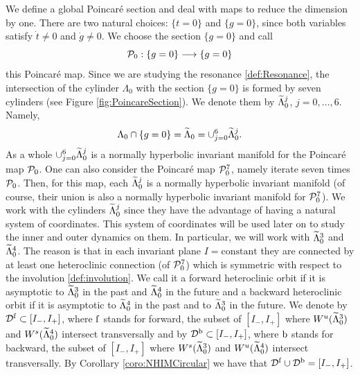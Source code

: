 We define a global Poincar{\'e} section and deal with maps to reduce the
dimension by one.  There are two natural choices: $\{t=0\}$ and
$\{g=0\}$, since both variables satisfy $\dot t\neq 0$ and $\dot g\neq
0$.  We choose the section $\{g=0\}$ and call
\begin{equation}\label{def:PoincareMap}
  \mathcal{P}_0:\{g=0\}\longrightarrow \{g=0\}
\end{equation}
this Poincar{\'e} map. Since we are studying the resonance \eqref{def:Resonance}, the intersection of the cylinder $\Lambda_0$ with the section $\{g=0\}$ is formed by seven cylinders (see Figure \ref{fig:PoincareSection}). We denote them by $\widetilde \Lambda_0^j$, $j=0,\ldots, 6$. Namely,
\begin{equation}\label{def:Cylinder:Poincare}
\Lambda_0\cap \{g=0\}=\widetilde\Lambda_0=\cup_{j=0}^6\widetilde\Lambda_0^j.
\end{equation}
As a whole $\cup_{j=0}^6\widetilde\Lambda_0^j$ is a normally hyperbolic invariant manifold for the Poincar{\'e} map
$\mathcal{P}_0$. One can also consider the Poincar\'e map $\mathcal{P}_0^7$, namely iterate seven times $\mathcal{P}_0$. Then, for this map, each $\widetilde\Lambda_0^j$ is a normally hyperbolic invariant manifold (of course, their union is also a normally hyperbolic invariant manifold for $\mathcal{P}_0^7$). We work with the cylinders $\widetilde\Lambda_0^j$ since they have the advantage of having a natural system of coordinates. This system of coordinates will be used later on to study the inner and outer dynamics on them. In particular, we will work with $\widetilde \Lambda_0^3$ and $\widetilde\Lambda_0^4$. The reason is that in each invariant plane $I=\text{constant}$ they are connected by at least one heteroclinic connection (of $\mathcal{P}_0^7$) which is symmetric with respect to the involution \eqref{def:involution}. We  call it a forward  heteroclinic orbit if it is asymptotic to $\widetilde \Lambda_0^3$ in the past and $\widetilde\Lambda_0^4$ in the future and a backward heteroclinic orbit if it is asymptotic to $\widetilde \Lambda_0^4$ in the past and to $\widetilde\Lambda_0^3$ in the future. We denote by $\mathcal{D}^{\mathrm{f}} \subset  [I_-,I_+]$, where $\mathrm{f}$ stands for forward, the subset of $[I_-,I_+]$ where  $W^u(\widetilde \Lambda_0^3)$ and $W^s(\widetilde \Lambda_0^4)$ intersect transversally and by $\mathcal{D}^{\mathrm{b}} \subset  [I_-,I_+]$, where $\mathrm{b}$ stands for backward, the subset of $[I_-,I_+]$ where  $W^s(\widetilde \Lambda_0^3)$ and $W^u(\widetilde \Lambda_0^4)$ intersect transversally.  By Corollary \ref{coro:NHIMCircular} we have that $\mathcal{D}^{\mathrm{f}}\cup\mathcal{D}^{\mathrm{b}}=  [I_-,I_+]$.


